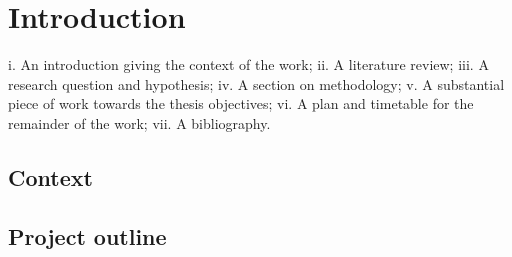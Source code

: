 \chapter{Introduction}
\label{chapterlabel1}

i. An introduction giving the context of the work;
ii. A literature review;
iii.
A research question and hypothesis;
iv. A section on methodology;
v. A substantial piece of work towards the thesis objectives;
vi. A plan and timetable for the remainder of the work;
vii. A bibliography.

\section{Context}

\section{Project outline}
